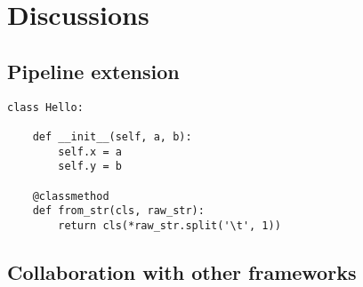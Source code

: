 \chapter{Discussions}
\label{c:discussion}

\section{Pipeline extension}

\begin{lstlisting}
class Hello:

    def __init__(self, a, b):
        self.x = a
        self.y = b

    @classmethod
    def from_str(cls, raw_str):
        return cls(*raw_str.split('\t', 1))
\end{lstlisting}


\section{Collaboration with other frameworks}

